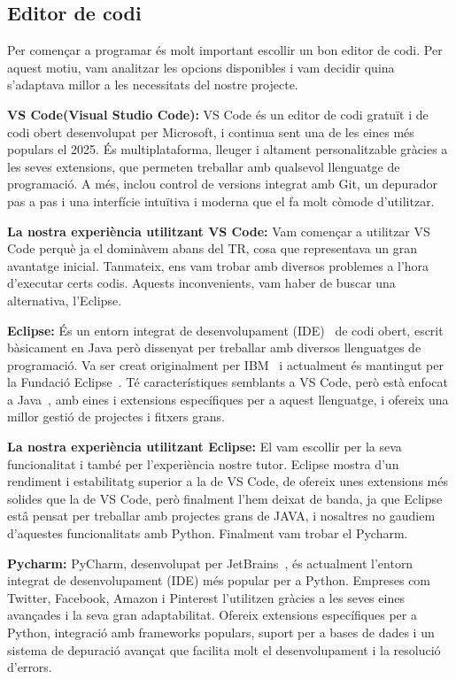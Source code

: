 \subsection{Editor de codi}
Per començar a programar és molt important escollir un bon editor de codi. Per aquest motiu, vam analitzar les opcions disponibles i vam decidir quina s’adaptava millor a les necessitats del nostre projecte.

\textbf{VS Code(Visual Studio Code): }
VS Code és un editor de codi gratuït i de codi obert desenvolupat per Microsoft, i continua sent una de les eines més populars el 2025. És multiplataforma, lleuger i altament personalitzable gràcies a les seves extensions, que permeten treballar amb qualsevol llenguatge de programació. A més, inclou control de versions integrat amb Git, un depurador pas a pas i una interfície intuïtiva i moderna que el fa molt còmode d’utilitzar.

\textbf{La nostra experiència utilitzant VS Code:}
Vam començar a utilitzar VS Code perquè ja el dominàvem abans del TR, cosa que representava un gran avantatge inicial. Tanmateix, ens vam trobar amb diversos problemes a l'hora d'executar certs codis. Aquests inconvenients, vam haber de buscar una alternativa, l'Eclipse.

\textbf{Eclipse: }
És un entorn integrat de desenvolupament (IDE)~\cite{IDE} de codi obert, escrit bàsicament en Java però dissenyat per treballar amb diversos llenguatges de programació. Va ser creat originalment per IBM~\cite{IBM_} i actualment és mantingut per la Fundació Eclipse~\cite{Fundation}. Té característiques semblants a VS Code, però està enfocat a Java~\cite{JAVA}, amb eines i extensions específiques per a aquest llenguatge, i ofereix una millor gestió de projectes i fitxers grans.

\textbf{La nostra experiència utilitzant Eclipse:}
El vam escollir per la seva funcionalitat i també per l'experiència nostre tutor. Eclipse mostra d'un rendiment i estabilitatg superior a la de VS Code, de ofereix unes extensions més solides que la de VS Code, però finalment l'hem deixat de banda, ja que Eclipse estâ pensat per treballar amb projectes grans de JAVA, i nosaltres no gaudiem d'aquestes funcionalitats amb Python. Finalment vam trobar el Pycharm.

\textbf{Pycharm: }
PyCharm, desenvolupat per JetBrains~\cite{Jet}, és actualment l’entorn integrat de desenvolupament (IDE) més popular per a Python. Empreses com Twitter, Facebook, Amazon i Pinterest l’utilitzen gràcies a les seves eines avançades i la seva gran adaptabilitat. Ofereix extensions específiques per a Python, integració amb frameworks populars, suport per a bases de dades i un sistema de depuració avançat que facilita molt el desenvolupament i la resolució d’errors.

